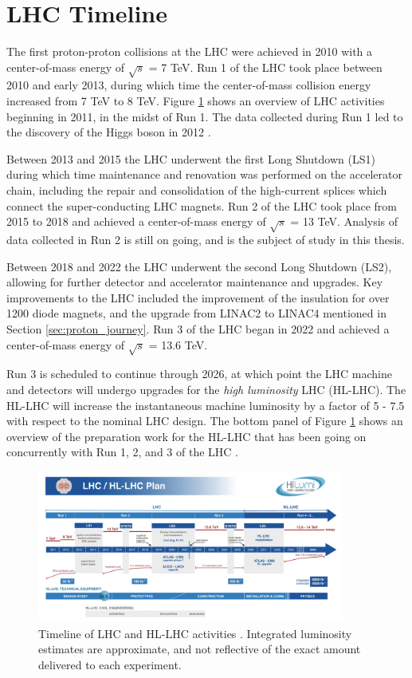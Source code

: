 \section{LHC Timeline}
The first proton-proton collisions at the LHC were achieved in 2010 with a center-of-mass energy of $\sqrt{s}$ = 7 TeV. Run 1 of the LHC took place between 2010 and early 2013, during which time the center-of-mass collision energy increased from 7 TeV to 8 TeV. Figure \ref{fig:lhc_timeline} shows an overview of LHC activities beginning in 2011, in the midst of Run 1. The data collected during Run 1 led to the discovery of the Higgs boson in 2012 \cite{higgs_paper}. \par

Between 2013 and 2015 the LHC underwent the first Long Shutdown (LS1) during which time maintenance and renovation was performed on the accelerator chain, including the repair and consolidation of the high-current splices which connect the super-conducting LHC magnets. Run 2 of the LHC took place from 2015 to 2018 and achieved a center-of-mass energy of $\sqrt{s}$ = 13 TeV. Analysis of data collected in Run 2 is still on going, and is the subject of study in this thesis. \par

Between 2018 and 2022 the LHC underwent the second Long Shutdown (LS2), allowing for further detector and accelerator maintenance and upgrades. Key improvements to the LHC included the improvement of the insulation for over 1200 diode magnets, and the upgrade from LINAC2 to LINAC4 mentioned in Section \ref{sec:proton_journey}. Run 3 of the LHC began in 2022 and achieved a center-of-mass energy of $\sqrt{s}$ = 13.6 TeV. \par

Run 3 is scheduled to continue through 2026, at which point the LHC machine and detectors will undergo upgrades for the \textit{high luminosity} LHC (HL-LHC). The HL-LHC will increase the instantaneous machine luminosity by a factor of 5 - 7.5 with respect to the nominal LHC design. The bottom panel of Figure \ref{fig:lhc_timeline} shows an overview of the preparation work for the HL-LHC that has been going on concurrently with Run 1, 2, and 3 of the LHC \cite{hl_lhc}. 

\begin{figure}
        \centering
	\includegraphics[width=0.9\textwidth]{figures/ch3/hl_lhc_timeline.png}
	\caption{Timeline of LHC and HL-LHC activities \cite{lhc_timeline}. Integrated luminosity estimates are approximate, and not reflective of the exact amount delivered to each experiment.}
	\label{fig:lhc_timeline}
\end{figure}
